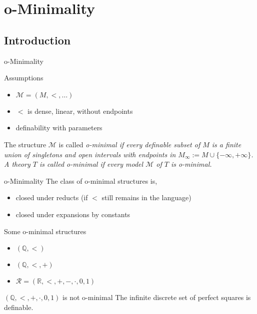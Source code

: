 
\section{o-Minimality}
\subsection{Introduction}


\begin{frame}{o-Minimality}
	\begin{block}{Assumptions}
		\begin{itemize}
			\item $\mathcal{M}=(M,<,\ldots)$
			\item $<$ is dense, linear, without endpoints
			\item definability with parameters
		\end{itemize}
	\end{block}

	\begin{definition}
		The structure $\mathcal{M}$ is called \em o-minimal \em if every definable subset of $M$ is a finite union of singletons and open intervals with endpoints in $M_{\infty}:=M\cup\{-\infty,+\infty\}$.\\
		A theory $T$ is called \em o-minimal \em if every model $\mathcal{M}$ of $T$ is o-minimal.
	\end{definition}
\end{frame}

\begin{frame}{o-Minimality}
	The class of o-minimal structures is,
		\begin{itemize}
			\item closed under reducts (if $<$ still remains in the language)
			\item closed under expansions by constants
		\end{itemize}

	\begin{exampleblock}{Some o-minimal structures}
		\begin{itemize}
			\item $(\mathbb{Q},<)$
			\item $(\mathbb{Q},<,+)$
			\item $\mathcal{R}=(\mathbb{R},<,+,-,\cdot,0,1)$
		\end{itemize}
	\end{exampleblock}

	\begin{block}{$(\mathbb{Q},<,+,\cdot,0,1)$ is not o-minimal}
		The infinite discrete set of perfect squares is definable.
	\end{block}
\end{frame}

